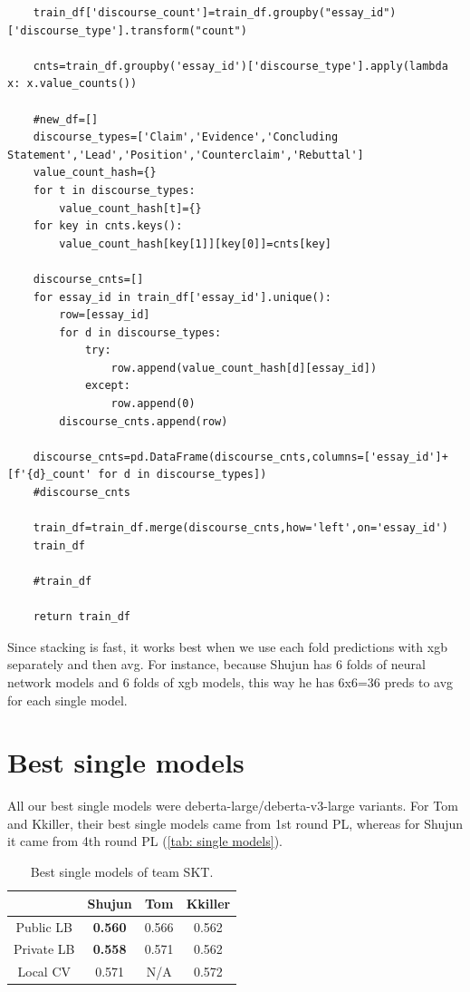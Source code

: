 \documentclass[11pt]{article} %
\begin{document}
\begin{verbatim}
    train_df['discourse_count']=train_df.groupby("essay_id")['discourse_type'].transform("count")

    cnts=train_df.groupby('essay_id')['discourse_type'].apply(lambda x: x.value_counts())

    #new_df=[]
    discourse_types=['Claim','Evidence','Concluding Statement','Lead','Position','Counterclaim','Rebuttal']
    value_count_hash={}
    for t in discourse_types:
        value_count_hash[t]={}
    for key in cnts.keys():
        value_count_hash[key[1]][key[0]]=cnts[key]

    discourse_cnts=[]    
    for essay_id in train_df['essay_id'].unique():
        row=[essay_id]
        for d in discourse_types:
            try:
                row.append(value_count_hash[d][essay_id])
            except:
                row.append(0)
        discourse_cnts.append(row)

    discourse_cnts=pd.DataFrame(discourse_cnts,columns=['essay_id']+[f'{d}_count' for d in discourse_types])    
    #discourse_cnts

    train_df=train_df.merge(discourse_cnts,how='left',on='essay_id')
    train_df

    #train_df

    return train_df

\end{verbatim}
Since stacking is fast, it works best when we use each fold predictions with xgb separately and then avg. For instance, because Shujun has 6 folds of neural network models and 6 folds of xgb models, this way he has 6x6=36 preds to avg for each single model.

\section{Best single models}
All our best single models were deberta-large/deberta-v3-large variants. For Tom and Kkiller, their best single models came from 1st round PL, whereas for Shujun it came from 4th round PL (\autoref{tab: single models}).

\begin{table}[H]
\center
\begin{tabular}{|c|c|c|c|}
\hline
           & Shujun         & Tom   & Kkiller \\ \hline
Public LB  & \textbf{0.560} & 0.566 & 0.562   \\ \hline
Private LB & \textbf{0.558} & 0.571 & 0.562   \\ \hline
Local CV   & 0.571          & N/A   & 0.572   \\ \hline
\end{tabular}
\caption{Best single models of team SKT. }
\label{tab: single models}
\end{table}
\end{document}
